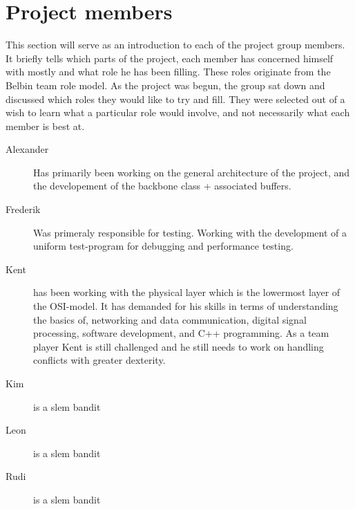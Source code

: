 \section{Project members}
This section will serve as an introduction to each of the project group members. It briefly tells which parts of the project, each member has concerned himself with mostly and what role he has been filling. These roles originate from the Belbin team role model. As the project was begun, the group sat down and discussed which roles they would like to try and fill. They were selected out of a wish to learn what a particular role would involve, and not necessarily what each member is best at.

\begin{description}
\item[Alexander] Has primarily been working on the general architecture of the project, and the developement of the backbone class + associated buffers.
\item[Frederik] Was primeraly responsible for testing. Working with the development of a uniform test-program for debugging and performance testing.
\item[Kent]
has been working with the physical layer which is the lowermost layer of the OSI-model. It has demanded for his skills in terms of understanding the basics of, networking and data communication, digital signal processing, software development, and C++ programming. As a team player Kent is still challenged and he still needs to work on handling conflicts with greater dexterity.
\item[Kim] is a slem bandit
\item[Leon] is a slem bandit
\item[Rudi] is a slem bandit
\end{description}